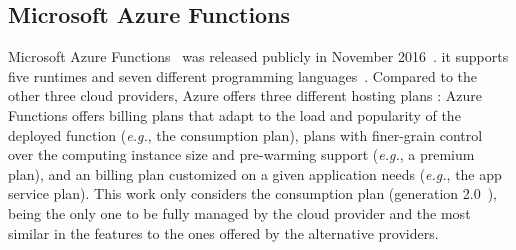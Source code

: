 \subsection{Microsoft Azure Functions}\label{sec:ss:azure}

Microsoft Azure Functions~\cite{AzureFunctions} was released publicly in November 2016~\cite{AzureFunctionsAnnouncement}. %
it supports five runtimes and seven different programming languages~\cite{AzureFunctionsLanguages}.
Compared to the other three cloud providers, Azure offers three different hosting plans \cite{AzureFunctionsPlans}:
Azure Functions offers billing plans that adapt to the load and popularity of the deployed function (\emph{e.g.}, the consumption plan), plans with finer-grain control over the computing instance size and pre-warming support (\emph{e.g.}, a premium plan), and an billing plan customized on a given application needs (\emph{e.g.}, the app service plan). 
This work only considers the consumption plan (generation 2.0~\cite{AzureFunctionsGenerations}), being the only one to be fully managed by the cloud provider and the most similar in the features to the ones offered by the alternative providers. 

